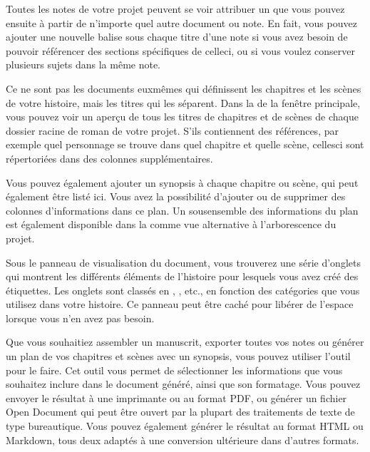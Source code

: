 \documentclass[a4paper,11pt,french]{sphinxmanual}
\begin{document}
\begin{description}
\sphinxAtStartPar
Toutes les notes de votre projet peuvent se voir attribuer un {\hyperref[\detokenize{int_glossary:term-Tag}]{}} que vous pouvez ensuite {\hyperref[\detokenize{int_glossary:term-Reference}]{}} à partir de n’importe quel autre document ou note. En fait, vous pouvez ajouter une nouvelle balise sous chaque titre d’une note si vous avez besoin de pouvoir référencer des sections spécifiques de celle\sphinxhyphen{}ci, ou si vous voulez conserver plusieurs sujets dans la même note.

\sphinxAtStartPar
Ce ne sont pas les documents eux\sphinxhyphen{}mêmes qui définissent les chapitres et les scènes de votre histoire, mais les titres qui les séparent. Dans la  de la fenêtre principale, vous pouvez voir un aperçu de tous les titres de chapitres et de scènes de chaque dossier racine de roman de votre projet. S’ils contiennent des références, par exemple quel personnage se trouve dans quel chapitre et quelle scène, celles\sphinxhyphen{}ci sont répertoriées dans des colonnes supplémentaires.

\sphinxAtStartPar
Vous pouvez également ajouter un synopsis à chaque chapitre ou scène, qui peut également être listé ici. Vous avez la possibilité d’ajouter ou de supprimer des colonnes d’informations dans ce plan. Un sous\sphinxhyphen{}ensemble des informations du plan est également disponible dans la  comme vue alternative à l’arborescence du projet.

\sphinxAtStartPar
Sous le panneau de visualisation du document, vous trouverez une série d’onglets qui montrent les différents éléments de l’histoire pour lesquels vous avez créé des étiquettes. Les onglets sont classés en , , etc., en fonction des catégories que vous utilisez dans votre histoire. Ce panneau peut être caché pour libérer de l’espace lorsque vous n’en avez pas besoin.

\sphinxAtStartPar
Que vous souhaitiez assembler un manuscrit, exporter toutes vos notes ou générer un plan de vos chapitres et scènes avec un synopsis, vous pouvez utiliser l’outil  pour le faire. Cet outil vous permet de sélectionner les informations que vous souhaitez inclure dans le document généré, ainsi que son formatage. Vous pouvez envoyer le résultat à une imprimante ou au format PDF, ou générer un fichier Open Document qui peut être ouvert par la plupart des traitements de texte de type bureautique. Vous pouvez également générer le résultat au format HTML ou Markdown, tous deux adaptés à une conversion ultérieure dans d’autres formats.

\end{description}
\end{document}
